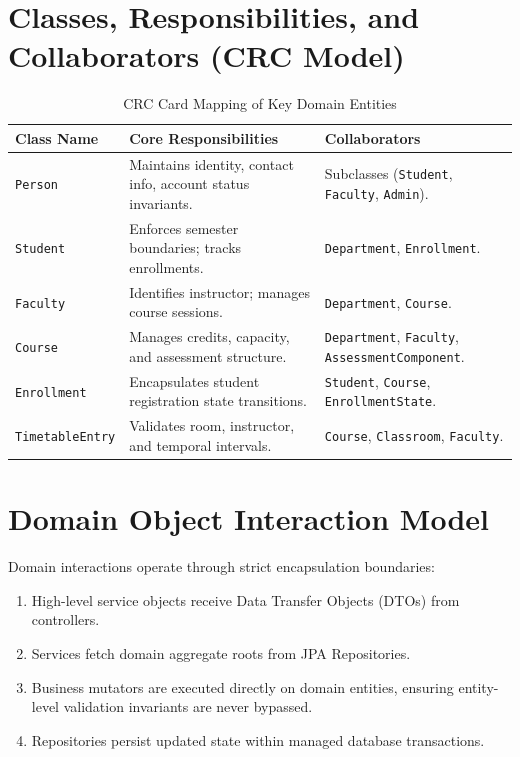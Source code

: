 \documentclass[12pt,a4paper,oneside]{report}
\begin{document}
\section{Classes, Responsibilities, and Collaborators (CRC Model)}
\begin{table}[h!]
\centering
\small
\begin{tabular}{p{}p{}p{}}
\toprule
\textbf{Class Name} & \textbf{Core Responsibilities} & \textbf{Collaborators} \\
\midrule
\texttt{Person} & Maintains identity, contact info, account status invariants. & Subclasses (\texttt{Student}, \texttt{Faculty}, \texttt{Admin}). \\
\texttt{Student} & Enforces semester boundaries; tracks enrollments. & \texttt{Department}, \texttt{Enrollment}. \\
\texttt{Faculty} & Identifies instructor; manages course sessions. & \texttt{Department}, \texttt{Course}. \\
\texttt{Course} & Manages credits, capacity, and assessment structure. & \texttt{Department}, \texttt{Faculty}, \texttt{AssessmentComponent}. \\
\texttt{Enrollment} & Encapsulates student registration state transitions. & \texttt{Student}, \texttt{Course}, \texttt{EnrollmentState}. \\
\texttt{TimetableEntry} & Validates room, instructor, and temporal intervals. & \texttt{Course}, \texttt{Classroom}, \texttt{Faculty}. \\
\bottomrule
\end{tabular}
\caption{CRC Card Mapping of Key Domain Entities}
\end{table}

\section{Domain Object Interaction Model}
Domain interactions operate through strict encapsulation boundaries:
\begin{enumerate}
    \item High-level service objects receive Data Transfer Objects (DTOs) from controllers.
    \item Services fetch domain aggregate roots from JPA Repositories.
    \item Business mutators are executed directly on domain entities, ensuring entity-level validation invariants are never bypassed.
    \item Repositories persist updated state within managed database transactions.
\end{enumerate}
\end{document}
